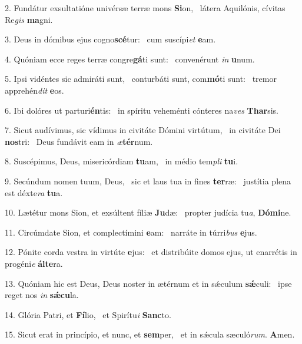 2. Fundátur exsultatióne univérsæ terræ mons \textbf{Si}on, \ast\  látera Aquilónis, cívitas Re\textit{gis} \textbf{ma}gni.\

3. Deus in dómibus ejus cogno\textbf{scé}tur: \ast\  cum suscípi\textit{et} \textbf{e}am.\

4. Quóniam ecce reges terræ congre\textbf{gá}ti sunt: \ast\  convenérunt \textit{in} \textbf{u}num.\

5. Ipsi vidéntes sic admiráti sunt, \dag\  conturbáti sunt, com\textbf{mó}ti sunt: \ast\  tremor apprehén\textit{dit} \textbf{e}os.\

6. Ibi dolóres ut parturi\textbf{én}tis: \ast\  in spíritu veheménti cónteres na\textit{ves} \textbf{Thar}sis.\

7. Sicut audívimus, sic vídimus in civitáte Dómini virtútum, \dag\  in civitáte Dei \textbf{nos}tri: \ast\  Deus fundávit eam in \textit{æ}\textbf{tér}num.\

8. Suscépimus, Deus, misericórdiam \textbf{tu}am, \ast\  in médio tem\textit{pli} \textbf{tu}i.\

9. Secúndum nomen tuum, Deus, \dag\  sic et laus tua in fines \textbf{ter}ræ: \ast\  justítia plena est déxte\textit{ra} \textbf{tu}a.\

10. Lætétur mons Sion, et exsúltent fíliæ \textbf{Ju}dæ: \ast\  propter judícia tu\textit{a}, \textbf{Dó}\textbf{mi}ne.\

11. Circúmdate Sion, et complectímini \textbf{e}am: \ast\  narráte in túrri\textit{bus} \textbf{e}jus.\

12. Pónite corda vestra in virtúte \textbf{e}jus: \ast\  et distribúite domos ejus, ut enarrétis in progéni\textit{e} \textbf{ál}\textbf{te}ra.\

13. Quóniam hic est Deus, Deus noster in ætérnum et in sǽculum \textbf{sǽ}culi: \ast\  ipse reget nos \textit{in} \textbf{sǽ}\textbf{cu}la.\

14. Glória Patri, et \textbf{Fí}lio, \ast\  et Spirítu\textit{i} \textbf{Sanc}to.\

15. Sicut erat in princípio, et nunc, et \textbf{sem}per, \ast\  et in sǽcula sæculó\textit{rum}. \textbf{A}men.\

